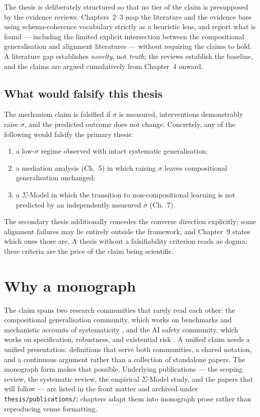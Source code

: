 The thesis is deliberately structured so that no tier of the claim is presupposed by
the evidence reviews. Chapters~2--3 map the literature and the evidence base using
schema-coherence vocabulary strictly as a heuristic lens, and report what is found
--- including the limited explicit intersection between the compositional
generalisation and alignment literatures --- without requiring the claims to hold.
A literature gap establishes \emph{novelty}, not \emph{truth}; the reviews establish the
baseline, and the claims are argued cumulatively from Chapter~4 onward.

\subsection{What would falsify this thesis}

The mechanism claim is falsified if $\sigma$ is measured, interventions demonstrably
raise $\sigma$, and the predicted outcome does not change. Concretely, any of the
following would falsify the primary thesis:

\begin{enumerate}
  \item a low-$\sigma$ regime observed with intact systematic generalisation;
  \item a mediation analysis (Ch.~5) in which raising $\sigma$ leaves compositional
    generalisation unchanged;
  \item a $\Sigma$-Model in which the transition to non-compositional learning is not
    predicted by an independently measured $\sigma$ (Ch.~7).
\end{enumerate}

The secondary thesis additionally concedes the converse direction explicitly: some
alignment failures may lie entirely outside the framework, and Chapter~9 states which
ones those are. A thesis without a falsifiability criterion reads as dogma; these
criteria are the price of the claim being scientific.

\section{Why a monograph}

The claim spans two research communities that rarely read each other: the
compositional generalisation community, which works on benchmarks and mechanistic
accounts of systematicity \citep{keysers2020measuring,hupkes2023taxonomy,
lake2023compositional}, and the AI safety community, which works on specification,
robustness, and existential risk \citep{bostrom2014superintelligence,
hendrycks2023overview,ji2023survey}. A unified claim needs a unified presentation:
definitions that serve both communities, a shared notation, and a continuous argument
rather than a collection of standalone papers. The monograph form makes that possible.
Underlying publications --- the scoping review, the systematic review, the empirical
$\Sigma$-Model study, and the papers that will follow --- are listed in the front
matter and archived under \texttt{thesis/publications/}; chapters adapt them into
monograph prose rather than reproducing venue formatting.

